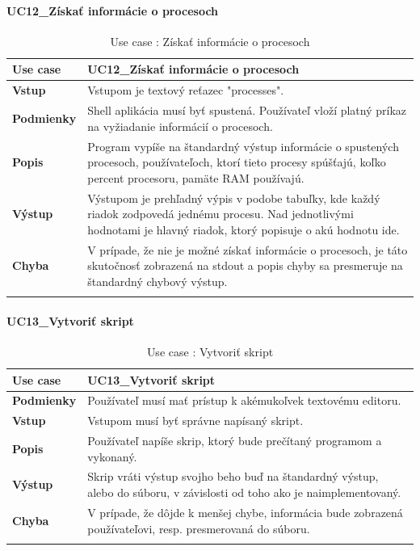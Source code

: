 \paragraph{UC12\_Získať informácie o procesoch}
\begin{center}
	\begin{longtable}{|p{2.5cm}|p{12.2cm}|}
		
			\hline
			\textbf{Use case} & UC12\_Získať informácie o procesoch \\ 
			\hline
			\textbf{Vstup} & Vstupom je textový reťazec "processes".\\
			\hline
			\textbf{Podmienky} & Shell aplikácia musí byť spustená. Používateľ vloží platný príkaz na vyžiadanie informácií o procesoch. \\ 
			\hline

			\textbf{Popis} & Program vypíše na štandardný výstup informácie o spustených procesoch, používateľoch, ktorí tieto procesy spúšťajú, koľko percent procesoru, pamäte RAM používajú.\\ 
			\hline

			\textbf{Výstup} & Výstupom je prehľadný výpis v podobe tabuľky, kde každý riadok zodpovedá jednému procesu. Nad jednotlivými hodnotami je hlavný riadok, ktorý popisuje o akú hodnotu ide.\\
			\hline
			\textbf{Chyba} & V prípade, že nie je možné získať informácie o procesoch, je táto skutočnosť zobrazená na stdout a popis chyby sa presmeruje na štandardný chybový výstup.\\
			\hline
		\caption{Use case : Získať informácie o procesoch}
		\label{table:1}
		
	\end{longtable}
\end{center}
\paragraph{UC13\_Vytvoriť skript}
\begin{center}
	\begin{longtable}{|p{2.5cm}|p{12.2cm}|}
		
			\hline
			\textbf{Use case} & UC13\_Vytvoriť skript \\ 
			\hline
			\textbf{Podmienky} & Používateľ musí mať prístup k akémukoľvek textovému editoru.  \\ 
			\hline
			\textbf{Vstup} & Vstupom musí byť správne napísaný skript. \\
			\hline
			\textbf{Popis} & Používateľ napíše skrip, ktorý bude prečítaný programom a vykonaný.\\ 
			\hline
			\textbf{Výstup} & Skrip vráti výstup svojho beho buď na štandardný výstup, alebo do súboru, v závislosti od toho ako je naimplementovaný.\\
			\hline
			\textbf{Chyba} & V prípade, že dôjde k menšej chybe, informácia bude zobrazená používateľovi, resp. presmerovaná do súboru.\\
			\hline
		\caption{Use case : Vytvoriť skript}
		\label{table:1}
		
	\end{longtable}
\end{center}
